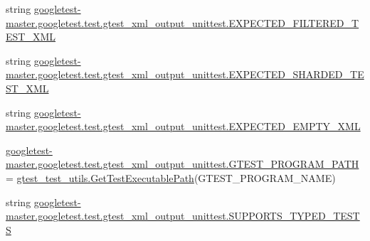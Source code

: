 \begin{DoxyCompactItemize}
string \mbox{\hyperlink{namespacegoogletest-master_1_1googletest_1_1test_1_1gtest__xml__output__unittest_ac6e2c8b9476aed2c20b9ce355b955713}{googletest-\/master.\+googletest.\+test.\+gtest\+\_\+xml\+\_\+output\+\_\+unittest.\+E\+X\+P\+E\+C\+T\+E\+D\+\_\+\+F\+I\+L\+T\+E\+R\+E\+D\+\_\+\+T\+E\+S\+T\+\_\+\+X\+ML}}
\item 
string \mbox{\hyperlink{namespacegoogletest-master_1_1googletest_1_1test_1_1gtest__xml__output__unittest_aa89944e0deaef28e27f9f1a2bddbcd49}{googletest-\/master.\+googletest.\+test.\+gtest\+\_\+xml\+\_\+output\+\_\+unittest.\+E\+X\+P\+E\+C\+T\+E\+D\+\_\+\+S\+H\+A\+R\+D\+E\+D\+\_\+\+T\+E\+S\+T\+\_\+\+X\+ML}}
\item 
string \mbox{\hyperlink{namespacegoogletest-master_1_1googletest_1_1test_1_1gtest__xml__output__unittest_abd3e38182f539421868f100b7fa34985}{googletest-\/master.\+googletest.\+test.\+gtest\+\_\+xml\+\_\+output\+\_\+unittest.\+E\+X\+P\+E\+C\+T\+E\+D\+\_\+\+E\+M\+P\+T\+Y\+\_\+\+X\+ML}}
\item 
\mbox{\hyperlink{namespacegoogletest-master_1_1googletest_1_1test_1_1gtest__xml__output__unittest_a0d99e98ad180ce6b0b2a617d6b57fe6c}{googletest-\/master.\+googletest.\+test.\+gtest\+\_\+xml\+\_\+output\+\_\+unittest.\+G\+T\+E\+S\+T\+\_\+\+P\+R\+O\+G\+R\+A\+M\+\_\+\+P\+A\+TH}} = \mbox{\hyperlink{namespacegtest__test__utils_a89ed3717984a80ffbb7a9c92f71b86a2}{gtest\+\_\+test\+\_\+utils.\+Get\+Test\+Executable\+Path}}(G\+T\+E\+S\+T\+\_\+\+P\+R\+O\+G\+R\+A\+M\+\_\+\+N\+A\+ME)
\item 
string \mbox{\hyperlink{namespacegoogletest-master_1_1googletest_1_1test_1_1gtest__xml__output__unittest_aed7867ea4492e742e43acfeeab381773}{googletest-\/master.\+googletest.\+test.\+gtest\+\_\+xml\+\_\+output\+\_\+unittest.\+S\+U\+P\+P\+O\+R\+T\+S\+\_\+\+T\+Y\+P\+E\+D\+\_\+\+T\+E\+S\+TS}}
\end{DoxyCompactItemize}
